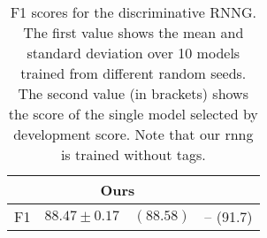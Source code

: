 \begin{table}[h]
\center
\footnotesize
  \begin{tabular}{l|c|c}
        & Ours & \citet{dyer2016rnng}  \\ \hline
    F1  & $88.47 \pm	0.17 \quad (88.58)$ & -- \quad (91.7)
  \end{tabular}
  \caption{F1 scores for the discriminative RNNG. The first value shows the mean and standard deviation over 10 models trained from different random seeds. The second value (in brackets) shows the score of the single model selected by development score. Note that our rnng is trained without tags.}
  \label{tab:disc-fscores}
\end{table}
